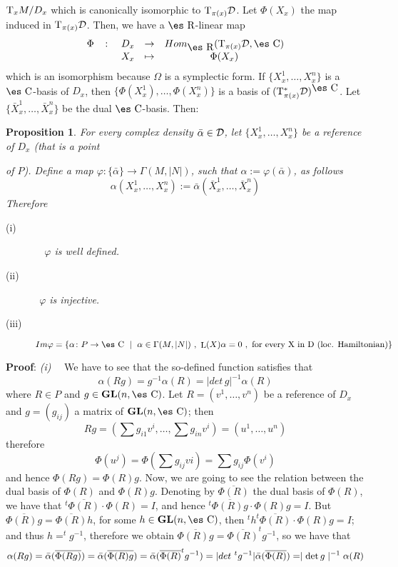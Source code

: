 \documentclass[12pt]{article}
\theoremstyle{plain}
\newtheorem{prop}{Proposition}
\def\GL{{\bf GL}(n,\Complex )}
\def\Real{\mbox{\es R}}
\def\Complex{\mbox{\es C}}
\def\Tan{{\rm T}}
\def\Lie{\mathop{\rm L}\nolimits}
\begin{document}
$\Tan_xM/D_x$ which is canonically isomorphic to $\Tan_{\pi (x)}{\cal
D}$.
Let $\Phi(X_x)$ the map induced in $\Tan_{\pi (x)}{\cal D}$.
Then, we have a $\Real$-linear map
$$
\begin{array}{ccccc}
\Phi & \colon & D_x & \to & Hom_{\Real}(\Tan_{\pi (x)}{\cal D},\Complex
)
\\
& & X_x & \mapsto & \Phi (X_x)
\end{array}
$$
which is an isomorphism because $\Omega$ is a symplectic form.
If $\{ X_x^1,\ldots ,X_x^n \}$ is a $\Complex$-basis of $D_x$, then
$\{ \Phi (X_x^1),\ldots ,\Phi (X_x^n) \}$ is a basis of
$(\Tan^*_{\pi (x)}{\cal D})^{\Complex}$.
 Let $\{ \bar X_x^1,\ldots ,\bar X_x^n \}$
be the dual $\Complex$-basis. Then:

\begin{prop}
For every complex density $\bar \alpha\in{\cal D}$,
let $\{ X_x^1,\ldots ,X_x^n \}$ be a reference of $D_x$ (that is a point

of $P$).
Define a map $\varphi\colon \{\bar\alpha\} \to \Gamma(M,| N |)$,
such that $\alpha :=\varphi (\bar \alpha)$, as follows
$$
\alpha (X_x^1,\ldots ,X_x^n) :=\bar \alpha (\bar X_x^1,\ldots ,\bar
X_x^n)
$$
Therefore
\begin{description}
\item[{\rm (i)}] \ \
$\varphi$ is well defined.
\item[{\rm (ii)}] \
$\varphi$ is injective.
\item[{\rm (iii)}]
$Im \varphi =\{ \alpha \colon P \to \Complex \ \mid \ \alpha \in
\Gamma(M,| N |) \ , \ \Lie(X)\alpha = 0 \ , \ \mbox{for every X in
D (loc. Hamiltonian)} \}$
\end{description}
\end{prop}
{\bf Proof}: 
{\it (i)} \ \
We have to see that the so-defined function satisfies that
$$
\alpha (Rg) = g^{-1} \alpha (R) =| det\, g |^{-1} \alpha (R)
$$
where $R \in P$ and $g \in \GL$. Let $R=(v^1,\ldots ,v^n)$ be
a reference of $D_x$ and $g=(g_{ij})$ a matrix of $\GL$; then
$$
Rg = (\sum g_{i1}v^i,\ldots ,\sum g_{in}v^i) = (u^1,\ldots ,u^n)
$$
therefore
$$
\Phi (u^j) = \Phi ( \sum g_{ij}vi) = \sum g_{ij} \Phi (v^i)
$$
and hence $\Phi (Rg) = \Phi (R) g$.
Now, we are going to see the relation between the dual basis of $\Phi
(R)$ and
$\Phi (R) g$. Denoting by $\overline {\Phi (R)}$
the dual basis of $\Phi(R)$, we have that $^t\overline {\Phi (R)} \cdot
\Phi (R) = I$, and hence
$^t\overline {\Phi (R) g} \cdot \Phi (R) g = I$.
But $\overline {\Phi (R) g} = \overline {\Phi (R)} h$,
for some $h \in \GL$, then $^th ^t\overline {\Phi (R)} \cdot \Phi (R) g
= I$;
and thus $h = ^tg^{-1}$, therefore we obtain
$\overline {\Phi (R) g} = \overline {\Phi (R)} ^tg^{-1}$, so we have
that
$$
\alpha (Rg)= \bar \alpha (\overline {\Phi (Rg)}) =
\bar \alpha (\overline {\Phi (R) g}) =
\bar \alpha (\overline {\Phi (R)}  ^tg^{-1}) =
| det \ ^tg^{-1} | \bar \alpha (\overline {\Phi (R)}) =
\mid {\rm det}\, g\mid^{-1} \alpha (R)
$$
\end{document}
